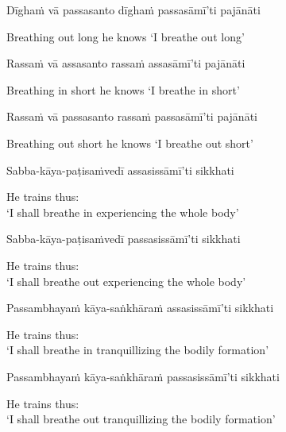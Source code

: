 Dīghaṁ vā passasanto dīghaṁ passasāmī'ti pajānāti

\begin{english}
  Breathing out long he knows `I breathe out long'
\end{english}

Rassaṁ vā assasanto rassaṁ assasāmī'ti pajānāti

\begin{english}
  Breathing in short he knows `I breathe in short'
\end{english}

\ifbfiveversion\clearpage\fi

Rassaṁ vā passasanto rassaṁ passasāmī'ti pajānāti

\begin{english}
  Breathing out short he knows `I breathe out short'
\end{english}

Sabba-kāya-paṭisaṁvedī assasissāmī'ti sikkhati

\begin{english}
  He trains thus:\\
  `I shall breathe in experiencing the whole body'
\end{english}

Sabba-kāya-paṭisaṁvedī passasissāmī'ti sikkhati

\begin{english}
  He trains thus:\\
  `I shall breathe out experiencing the whole body'
\end{english}

Passambhayaṁ kāya-saṅkhāraṁ assasissāmī'ti sikkhati

\begin{english}
  He trains thus:\\
  `I shall breathe in tranquillizing the bodily formation'\ifdigitalversion\makeatletter\hyperlink{endnote68-appendix}\makeatother\fi
\end{english}

Passambhayaṁ kāya-saṅkhāraṁ passasissāmī'ti sikkhati

\begin{english}
  He trains thus:\\
  `I shall breathe out tranquillizing the bodily formation'
\end{english}

